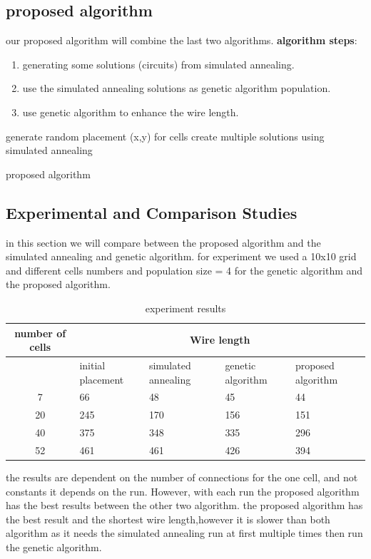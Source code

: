 \documentclass[conference]{IEEEtran}
\begin{document}
\subsection{proposed algorithm}
our proposed algorithm will combine the last two algorithms.
\newline\newline
\textbf{algorithm steps}:
\begin{enumerate} 
\item generating some solutions (circuits) from simulated annealing.

\item use the simulated annealing solutions as genetic algorithm population.

\item use genetic algorithm to enhance the wire length.

\end{enumerate}

\begin{algorithm}
\SetAlgoLined
{}
 generate random placement (x,y) for cells\;
 create multiple solutions using simulated annealing\;
 \caption{proposed algorithm}
\end{algorithm}
\subsection{Experimental and Comparison Studies}
in this section we will compare between the proposed algorithm and the simulated annealing and genetic algorithm.
for experiment we used a 10x10 grid and different cells numbers and population size = 4 for the genetic algorithm and the proposed algorithm.

\begin{table}[h!]
\centering
\begin{tabular}{ |c || p{1.5cm}|p{1.5cm}|p{1.5cm}|p{1.5cm}|}
 \hline
 number of cells & \multicolumn{4}{|c|}{Wire length} \\
 \hline
   & initial placement & simulated annealing & genetic algorithm & proposed algorithm\\
 \hline
 7 & 66 & 48 & 45 & 44 \\ [1ex] 
 \hline
 20 & 245 & 170 & 156& 151 \\[1ex] 
 \hline
 40 & 375 & 348 & 335 & 296\\[1ex] 
 \hline
 52 & 461 & 461 & 426& 394 \\ [1ex] 
 \hline
\end{tabular}
\caption{experiment results}
\label{table:1}
\end{table}
the results are dependent on the number of connections for the one cell, and not constants it depends on the run. However, with each run the proposed algorithm has the best results between the other two algorithm. \newline
the proposed algorithm has the best result and the shortest wire length,however it is slower than both algorithm as it needs the simulated annealing run at first multiple times then run the genetic algorithm.
\end{document}
